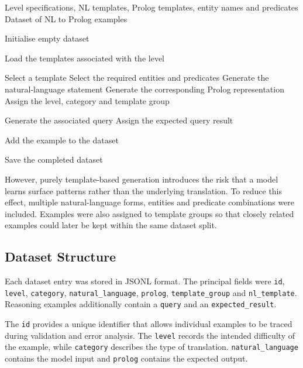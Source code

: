 \documentclass[11pt]{article} %
\theoremstyle{plain}
\theoremstyle{definition}
\begin{document}
\begin{algorithm}[ht]
\caption{NL to Prolog Dataset Generation}
\label{alg:dataset_generation}
\begin{algorithmic}[1]
\Require Level specifications, NL templates, Prolog templates,
         entity names and predicates
\Ensure Dataset of NL to Prolog examples

\State Initialise empty dataset

    \State Load the templates associated with the level

        \State Select a template
        \State Select the required entities and predicates
        \State Generate the natural-language statement
        \State Generate the corresponding Prolog representation
        \State Assign the level, category and template group

            \State Generate the associated query
            \State Assign the expected query result
        \EndIf

            \State Add the example to the dataset
        \EndIf
    \EndWhile
\EndFor

\State Save the completed dataset
\end{algorithmic}
\end{algorithm}

However, purely template-based generation introduces the risk that a model
learns surface patterns rather than the underlying translation. To reduce this
effect, multiple natural-language forms, entities and predicate combinations
were included. Examples were also assigned to template groups so that closely
related examples could later be kept within the same dataset split.

\subsection{Dataset Structure}

Each dataset entry was stored in JSONL format. The principal fields were
\texttt{id}, \texttt{level}, \texttt{category}, \texttt{natural\_language},
\texttt{prolog}, \texttt{template\_group} and \texttt{nl\_template}. Reasoning
examples additionally contain a \texttt{query} and an
\texttt{expected\_result}.

The \texttt{id} provides a unique identifier that allows individual examples to
be traced during validation and error analysis. The \texttt{level} records the
intended difficulty of the example, while \texttt{category} describes the type
of translation. \texttt{natural\_language} contains the model input and
\texttt{prolog} contains the expected output.
\end{document}
